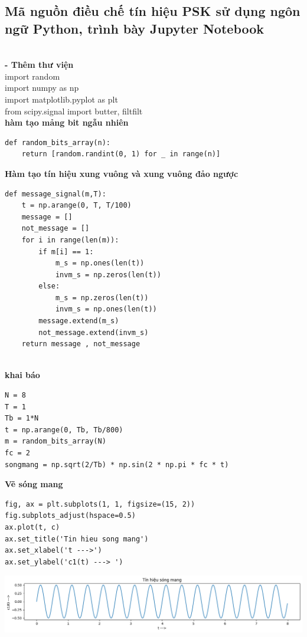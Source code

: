 \subsection{Mã nguồn điều chế tín hiệu PSK sử dụng ngôn ngữ Python, trình bày Jupyter Notebook }
\\ 
\textbf{ - Thêm thư viện} \\
import random \\ 
import numpy as np \\
import matplotlib.pyplot as plt \\ 
from scipy.signal import butter, filtfilt \\ 
\textbf{hàm tạo mảng bit ngẫu nhiên} \\ 
\begin{lstlisting}
def random_bits_array(n):   
    return [random.randint(0, 1) for _ in range(n)] 
\end{lstlisting}
\textbf{Hàm tạo tín hiệu xung vuông và xung vuông đảo ngược}
\begin{lstlisting}
def message_signal(m,T):                         
    t = np.arange(0, T, T/100)             
    message = []                           
    not_message = []
    for i in range(len(m)): 
        if m[i] == 1:                     
            m_s = np.ones(len(t))          
            invm_s = np.zeros(len(t))
        else:
            m_s = np.zeros(len(t))         
            invm_s = np.ones(len(t))       
        message.extend(m_s)                 
        not_message.extend(invm_s)         
    return message , not_message    
    
\end{lstlisting}
\textbf{khai báo}
\begin{lstlisting}
N = 8    
T = 1        
Tb = 1*N      
t = np.arange(0, Tb, Tb/800)  
m = random_bits_array(N) 
fc = 2                                         
songmang = np.sqrt(2/Tb) * np.sin(2 * np.pi * fc * t)  
\end{lstlisting}
\textbf{Vẽ sóng mang}
\begin{lstlisting}
fig, ax = plt.subplots(1, 1, figsize=(15, 2))   
fig.subplots_adjust(hspace=0.5)                 
ax.plot(t, c)                                  
ax.set_title('Tin hieu song mang')           
ax.set_xlabel('t --->')
ax.set_ylabel('c1(t) ---> ')
\end{lstlisting}
\begin{center}
     \includegraphics[scale=.5]{Img/tinhieusongmang.png}
\end{center}

